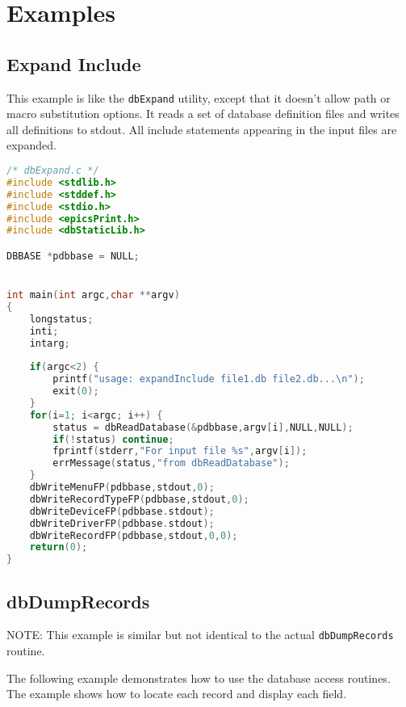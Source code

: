 \section{Examples}

\subsection{Expand Include}

This example is like the \verb|dbExpand| utility, except that it doesn't allow path or macro substitution options.
It reads a set of database definition files and writes all definitions to stdout.
All include statements appearing in the input files are expanded.

\begin{lstlisting}[language=C]
/* dbExpand.c */
#include <stdlib.h>
#include <stddef.h>
#include <stdio.h>
#include <epicsPrint.h>
#include <dbStaticLib.h>

DBBASE *pdbbase = NULL;


int main(int argc,char **argv)
{
    longstatus;
    inti;
    intarg;
 
    if(argc<2) {
        printf("usage: expandInclude file1.db file2.db...\n");
        exit(0);
    }
    for(i=1; i<argc; i++) {
        status = dbReadDatabase(&pdbbase,argv[i],NULL,NULL);
        if(!status) continue;
        fprintf(stderr,"For input file %s",argv[i]);
        errMessage(status,"from dbReadDatabase");
    }
    dbWriteMenuFP(pdbbase,stdout,0);
    dbWriteRecordTypeFP(pdbbase,stdout,0);
    dbWriteDeviceFP(pdbbase.stdout);
    dbWriteDriverFP(pdbbase.stdout);
    dbWriteRecordFP(pdbbase,stdout,0,0);
    return(0);
}

\end{lstlisting}

\subsection{dbDumpRecords}

NOTE: This example is similar but not identical to the actual \verb|dbDumpRecords| routine.

The following example demonstrates how to use the database access routines.
The example shows how to locate each record and display each field.

